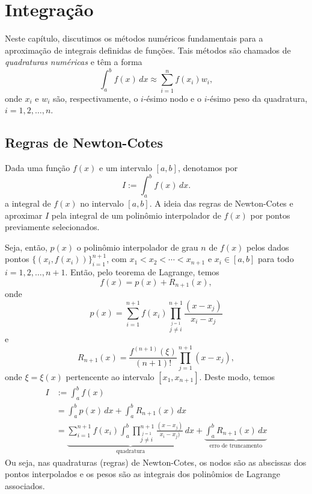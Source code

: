 
\chapter{Integração}\label{cap_integr}
\thispagestyle{fancy}

Neste capítulo, discutimos os métodos numéricos fundamentais para a aproximação de integrais definidas de funções. Tais métodos são chamados de \emph{quadraturas numéricas} e têm a forma
\begin{equation}
  \int_a^b f(x)\,dx \approx \sum_{i=1}^n f(x_i)w_i,
\end{equation}
onde $x_i$ e $w_i$ são, respectivamente, o $i$-ésimo nodo e o $i$-ésimo peso da quadratura, $i=1, 2, \dotsc, n$.

\section{Regras de Newton-Cotes}\label{cap_integr_sec_NC}

Dada uma função $f(x)$ e um intervalo $[a, b]$, denotamos por
\begin{equation}
  I := \int_a^b f(x)\,dx.
\end{equation}
a integral de $f(x)$ no intervalo $[a, b]$. A ideia das regras de Newton-Cotes e aproximar $I$ pela integral de um polinômio interpolador de $f(x)$ por pontos previamente selecionados.

Seja, então, $p(x)$ o polinômio interpolador de grau $n$ de $f(x)$ pelos dados pontos $\{(x_i, f(x_i))\}_{i=1}^{n+1}$, com $x_1 < x_2 < \cdots < x_{n+1}$ e $x_i\in [a, b]$ para todo $i=1, 2, \dotsc, n+1$. Então, pelo teorema de Lagrange, temos
\begin{equation}
  f(x) = p(x) + R_{n+1}(x),
\end{equation}
onde
\begin{equation}
  p(x) = \sum_{i=1}^{n+1} f(x_i)\prod_{\overset{j=1}{j\neq i}}^{n+1} \frac{(x-x_j)}{x_i-x_j}
\end{equation}
e
\begin{equation}
  R_{n+1}(x) = \frac{f^{(n+1)}(\xi)}{(n+1)!}\prod_{j=1}^{n+1}(x-x_j),
\end{equation}
onde $\xi = \xi(x)$ pertencente ao intervalo $[x_1, x_{n+1}]$. Deste modo, temos
\begin{align}
  I &:= \int_a^b f(x)\\
  &= \int_a^b p(x)\,dx + \int_a^b R_{n+1}(x)\,dx\\
  &= \underbrace{\sum_{i=1}^{n+1} f(x_i)\int_a^b \prod_{\overset{j=1}{j\neq i}}^{n+1} \frac{(x-x_j)}{x_i-x_j)}\,dx}_{\text{quadratura}} + \underbrace{\int_a^b R_{n+1}(x)\,dx}_{\text{erro de truncamento}}
\end{align}
Ou seja, nas quadraturas (regras) de Newton-Cotes, os nodos são as abscissas dos pontos interpolados e os pesos são as integrais dos polinômios de Lagrange associados.

